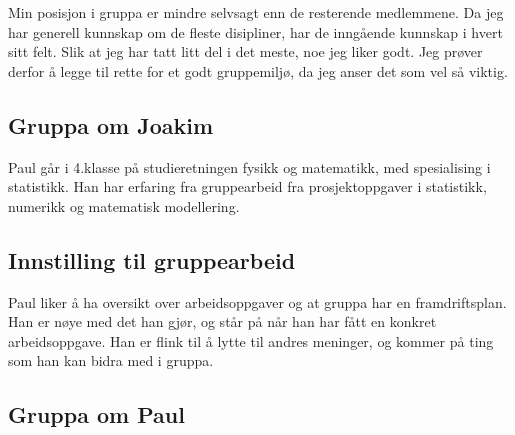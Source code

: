 Min posisjon i gruppa er mindre selvsagt enn de resterende medlemmene. Da jeg har generell
kunnskap om de fleste disipliner, har de inngående kunnskap i hvert sitt felt.
Slik at jeg har tatt litt del i det meste, noe jeg liker godt. Jeg prøver derfor
å legge til rette for et godt gruppemiljø, da jeg anser det som vel så viktig.

\subsection*{Gruppa om Joakim}




\lipsum[3-4]

Paul går i 4.klasse på studieretningen fysikk og matematikk, med spesialising i statistikk. Han har erfaring fra gruppearbeid fra prosjektoppgaver i statistikk, numerikk og matematisk modellering.

\subsection*{Innstilling til gruppearbeid}
Paul liker å ha oversikt over arbeidsoppgaver og at gruppa har en framdriftsplan. Han er nøye med det han gjør, og står på når han har fått en konkret arbeidsoppgave. Han er flink til å lytte til andres meninger, og kommer på ting som han kan bidra med i gruppa.

\subsection*{Gruppa om Paul}

\lipsum[7-8]

